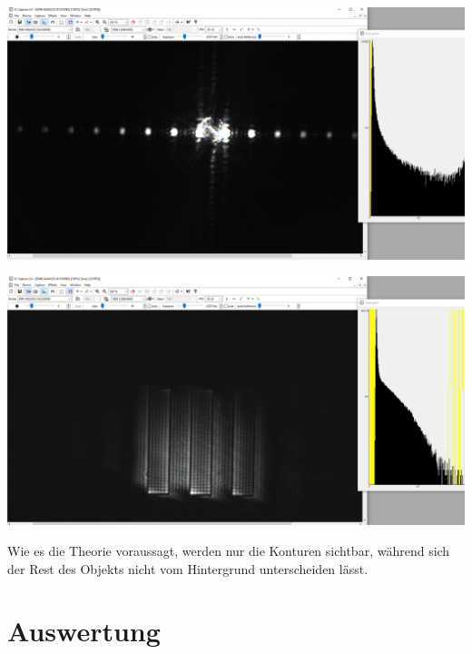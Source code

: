 \documentclass[11pt,ngerman]{scrartcl}
\begin{document}
\begin{minipage}{\textwidth}
	\begin{minipage}[t]{0.5\textwidth}
		\centering
		\includegraphics[width=\textwidth]{abbe/dunkelfeld_mustere}
		\label{fig:dunkelf_beu}
	\end{minipage}
	\vspace{2mm}
	\begin{minipage}[t]{0.50\textwidth}
		\centering
		\includegraphics[width=\textwidth]{abbe/dunkelfeld_bild}
		\label{fig:dunkelf_bild}
	\end{minipage}
	\vspace{1em}
\end{minipage}

Wie es die Theorie voraussagt, werden nur die Konturen sichtbar, während sich der Rest des Objekts nicht vom Hintergrund unterscheiden lässt.


\vspace{5mm}

\section{Auswertung}
\end{document}
